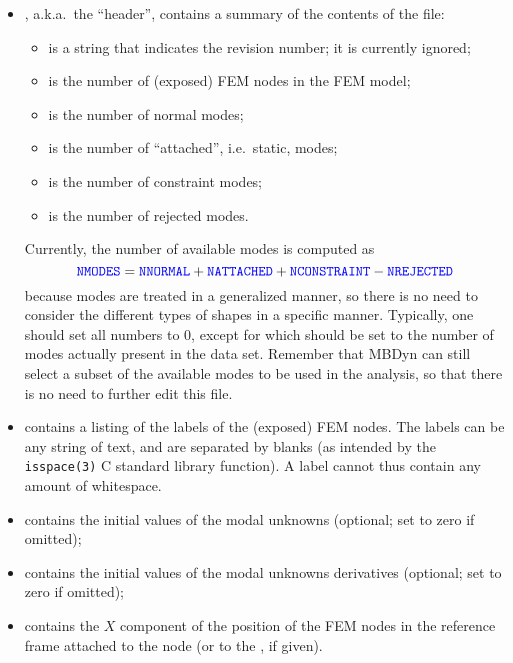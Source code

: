 \begin{itemize}
\item {}, a.k.a.\ the ``header'', contains a summary
of the contents of the file:
	\begin{itemize}
	\item {} is a string that indicates the revision number;
	it is currently ignored;
	\item {} is the number of (exposed) FEM nodes 
	in the FEM model;
	\item {} is the number of normal modes;
	\item {} is the number of ``attached'',
	i.e.\ static, modes;
	\item {} is the number of constraint modes;
	\item {} is the number of rejected modes.
	\end{itemize}
Currently, the number of available modes is computed as
\begin{displaymath}
	\textcolor{blue}{\texttt{NMODES}} = \textcolor{blue}{\texttt{NNORMAL}} + \textcolor{blue}{\texttt{NATTACHED}}
		+ \textcolor{blue}{\texttt{NCONSTRAINT}} - \textcolor{blue}{\texttt{NREJECTED}}
\end{displaymath}
because modes are treated in a generalized manner,
so there is no need to consider the different types of shapes
in a specific manner.
Typically, one should set all numbers to 0, except for
 which should be set to the number of modes
actually present in the data set.
Remember that MBDyn can still select a subset of the available 
modes to be used in the analysis, so that there is no need 
to further edit this file.

\item {} contains a listing of the  labels
of the (exposed) FEM nodes.
The labels can be any string of text, and are separated by blanks
(as intended by the \texttt{isspace(3)} C standard library function).
A label cannot thus contain any amount of whitespace.

\item {} contains the initial values of the 
modal unknowns  (optional; set to zero if omitted);

\item {} contains the initial values of the 
modal unknowns derivatives (optional; set to zero if omitted);

\item {} contains the $X$ component of the position
of the  FEM nodes in the reference frame attached 
to the  node (or to the , if given).


\end{itemize}
